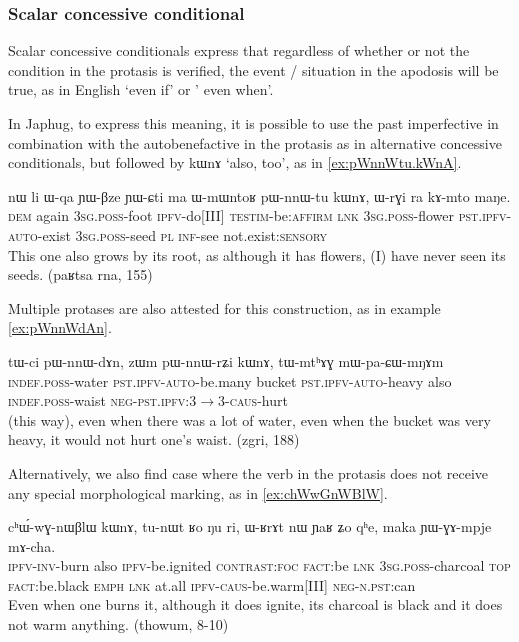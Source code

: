 \documentclass[oldfontcommands,oneside,a4paper,11pt]{article}
\newcommand{\ipa}[1]{{\phon \mbox{#1}}} %
\begin{document}
\subsubsection{Scalar concessive conditional}
Scalar concessive conditionals express that regardless of whether or not the condition in the protasis is verified, the event / situation in the apodosis will be true, as in English `even if' or ' even when'.


In Japhug, to express this meaning, it is possible to use the past imperfective in combination with the autobenefactive in the protasis as in alternative concessive conditionals, but followed by \ipa{kɯnɤ} `also, too', as in \ref{ex:pWnnWtu.kWnA}.


 \begin{exe}
\ex  \label{ex:pWnnWtu.kWnA}
\gll
\ipa{nɯ}    	\ipa{li}    	\ipa{ɯ-qa}    	\ipa{ɲɯ-βze}    	\ipa{ɲɯ-ɕti}    	\ipa{ma}    	\ipa{ɯ-mɯntoʁ}    	\ipa{pɯ-nnɯ-tu}    	\ipa{kɯnɤ,}    	\ipa{ɯ-rɣi}    	\ipa{ra}    	\ipa{kɤ-mto}    	\ipa{maŋe.}    \\
\textsc{dem} again \textsc{3sg.poss}-foot \textsc{ipfv}-do[III] \textsc{testim}-be:\textsc{affirm} \textsc{lnk} \textsc{3sg.poss}-flower \textsc{pst.ipfv-auto}-exist \textsc{3sg.poss}-seed \textsc{pl} \textsc{inf}-see not.exist:\textsc{sensory} \\
\glt This one also grows by its root, as although it has flowers, (I) have never seen its seeds. (paʁtsa rna, 155)
\end{exe}
Multiple protases are also attested for this construction, as in example   \ref{ex:pWnnWdAn}.
\begin{exe}
\ex  \label{ex:pWnnWdAn}
\gll
\ipa{tɯ-ci}    	\ipa{pɯ-nnɯ-dɤn,}    	\ipa{zɯm}    	\ipa{pɯ-nnɯ-rʑi}    	\ipa{kɯnɤ,}    	\ipa{tɯ-mtʰɤɣ}    	\ipa{mɯ-pa-ɕɯ-mŋɤm}    \\
\textsc{indef.poss}-water \textsc{pst.ipfv-auto}-be.many bucket  \textsc{pst.ipfv-auto}-heavy also \textsc{indef.poss}-waist \textsc{neg-pst.ipfv:3$\rightarrow$3-caus}-hurt\\
\glt (this way), even when there was a lot of water, even when the bucket was very heavy, it would not hurt one's waist. (zgri, 188)
\end{exe}

Alternatively, we also find case where the verb in the protasis does not receive any special morphological marking, as in \ref{ex:chWwGnWBlW}.
\begin{exe}
\ex  \label{ex:chWwGnWBlW}
\gll
\ipa{cʰɯ́-wɣ-nɯβlɯ}    	\ipa{kɯnɤ,}    	\ipa{tu-nɯt}    	\ipa{ʁo}    	\ipa{ŋu}    	\ipa{ri,}    	\ipa{ɯ-ʁrɤt}    	\ipa{nɯ}    	\ipa{ɲaʁ}    	\ipa{ʑo}    	\ipa{qʰe,}    	\ipa{maka}    	\ipa{ɲɯ-ɣɤ-mpje}    	\ipa{mɤ-cha.}    	\\
\textsc{ipfv-inv}-burn also \textsc{ipfv}-be.ignited \textsc{contrast:foc} \textsc{fact}:be \textsc{lnk}
\textsc{3sg.poss}-charcoal \textsc{top}  \textsc{fact}:be.black \textsc{emph} \textsc{lnk} at.all \textsc{ipfv-caus}-be.warm[III] \textsc{neg-n.pst}:can \\
\glt Even when one burns it, although it does ignite, its charcoal is black and it does not warm anything. (thowum, 8-10)
\end{exe}
\end{document}
